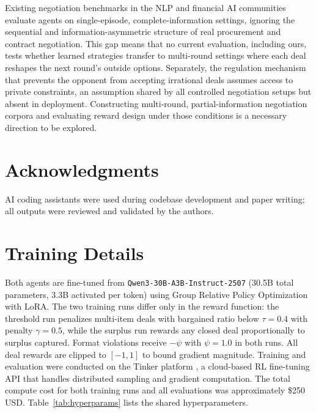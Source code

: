 \documentclass[11pt]{article}
\newcommand{\model}[1]{\texttt{#1}}
\begin{document}
Existing negotiation benchmarks in the NLP and financial AI communities evaluate agents on single-episode, complete-information settings, ignoring the sequential and information-asymmetric structure of real procurement and contract negotiation. This gap means that no current evaluation, including ours, tests whether learned strategies transfer to multi-round settings where each deal reshapes the next round's outside options. Separately, the regulation mechanism that prevents the opponent from accepting irrational deals assumes access to private constraints, an assumption shared by all controlled negotiation setups but absent in deployment. Constructing multi-round, partial-information negotiation corpora and evaluating reward design under those conditions is a necessary direction to be explored.

\section*{Acknowledgments}
AI coding assistants were used during codebase development and paper writing; all outputs were reviewed and validated by the authors.


\clearpage

\appendix

\section{Training Details}
\label{app:training}


Both agents are fine-tuned from \model{Qwen3-30B-A3B-Instruct-2507} (30.5B total parameters, 3.3B activated per token) using Group Relative Policy Optimization \citep{shao2024deepseekmath} with LoRA. The two training runs differ only in the reward function: the threshold run penalizes multi-item deals with bargained ratio below $\tau = 0.4$ with penalty $\gamma{=}0.5$, while the surplus run rewards any closed deal proportionally to surplus captured. Format violations receive $-\psi$ with $\psi{=}1.0$ in both runs. All deal rewards are clipped to $[-1, 1]$ to bound gradient magnitude. Training and evaluation were conducted on the Tinker platform \citep{tinker2025}, a cloud-based RL fine-tuning API that handles distributed sampling and gradient computation. The total compute cost for both training runs and all evaluations was approximately \$250 USD. Table~\ref{tab:hyperparams} lists the shared hyperparameters.
\end{document}

